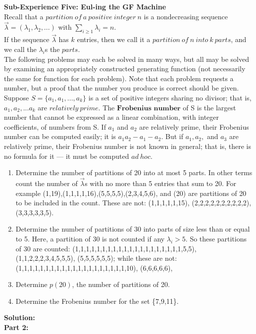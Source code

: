 \documentclass[10pt,a4paper]{report}
\begin{document}
	\textbf{Sub-Experience Five: Eul-ing the GF Machine}\\
	Recall that a $partition\ of\ a\ positive\ integer\ n$ is a nondecreasing sequence $\vec{\lambda} = (\lambda_1,\lambda_2,...)$ with $\sum_{i\geq1}^{}\lambda_i = n$.\\
	If the sequence $\vec{\lambda}$ has $k$ entries, then we call it a $partition\ of\ n\ into\ k\ parts$, and we call the $\lambda_i$s the $parts$.\\
	The following problems may each be solved in many ways, but all may be solved by examining an appropriately constructed generating function (not necessarily the same for function for each problem).  Note that each problem requests a number, but a proof that the number you produce is correct should be given.\\
	Suppose $S = \{a_1,a_1,...,a_k\}$ is a set of positive integers sharing no divisor; that is, $a_1,a_2,...a_k$ are $relatively\ prime$.  The $\textbf{Frobenius number}$ of S is the largest number that cannot be expressed as a linear combination, with integer coefficients, of numbers from S.  If $a_1$ and $a_2$ are relatively prime, their Frobenius number can be computed easily; it is $a_1a_2 - a_1 - a_2$.  But if $a_1,a_2,$ and $a_3$ are relatively prime, their Frobenius number is not known in general; that is, there is no formula for it --- it must be computed $ad\ hoc$.\\
	\begin{enumerate}
		\item Determine the number of partitions of 20 into at most 5 parts.  In other terms count the number of $\vec{\lambda}$s with no more than 5 entries that sum to 20.  For example (1,19),(1,1,1,1,16),(5,5,5,5),(2,3,4,5,6), and (20) are partitions of 20 to be included in the count.  These are not: (1,1,1,1,1,15), (2,2,2,2,2,2,2,2,2,2), (3,3,3,3,3,5).
		\item Determine the number of partitions of 30 into parts of size less than or equal to 5.  Here, a partition of 30 is not counted if any $\lambda_i > 5$.  So these partitions of 30 are counted: (1,1,1,1,1,1,1,1,1,1,1,1,1,1,1,1,1,1,1,1,5,5), (1,1,2,2,2,3,4,5,5,5), (5,5,5,5,5,5); while these are not: (1,1,1,1,1,1,1,1,1,1,1,1,1,1,1,1,1,1,1,1,10), (6,6,6,6,6),
		\item Determine $p(20)$, the number of partitions of 20.
		\item Determine the Frobenius number for the set \{7,9,11\}.\\
	\end{enumerate}
	\textbf{Solution: }\\
	\newline
\textbf{Part 2:}
\end{document}
